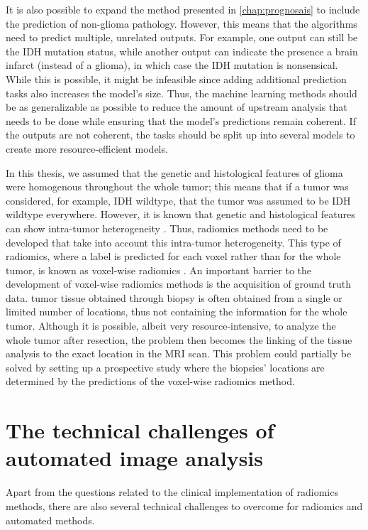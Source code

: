 It is also possible to expand the method presented in \cref{chap:prognosais} to include the prediction of non-glioma pathology.
However, this means that the algorithms need to predict multiple, unrelated outputs.
For example, one output can still be the \gls{IDH} mutation status, while another output can indicate the presence a brain infarct (instead of a glioma), in which case the \gls{IDH} mutation is nonsensical.
While this is possible, it might be infeasible since adding additional prediction tasks also increases the model's size.
Thus, the machine learning methods should be as generalizable as possible to reduce the amount of upstream analysis that needs to be done while ensuring that the model's predictions remain coherent.
If the outputs are not coherent, the tasks should be split up into several models to create more resource-efficient models.

In this thesis, we assumed that the genetic and histological features of glioma were homogenous throughout the whole \gls{tumor}; this means that if a \gls{tumor} was considered, for example, \gls{IDH} wildtype, that the \gls{tumor} was assumed to be \gls{IDH} wildtype everywhere.
However, it is known that genetic and histological features can show intra-\gls{tumor} heterogeneity \autocite{eder2014heterogeneity}.
Thus, radiomics methods need to be developed that take into account this intra-\gls{tumor} heterogeneity.
This type of radiomics, where a label is predicted for each voxel rather than for the whole \gls{tumor}, is known as voxel-wise radiomics \autocite{yogananda20201p19q}.
An important barrier to the development of voxel-wise radiomics methods is the acquisition of ground truth data.
\Gls{tumor} tissue obtained through biopsy is often obtained from a single or limited number of locations, thus not containing the information for the whole \gls{tumor}.
Although it is possible, albeit very resource-intensive, to analyze the whole \gls{tumor} after resection, the problem then becomes the linking of the tissue analysis to the exact location in the \gls{MRI} scan.
This problem could partially be solved by setting up a prospective study where the biopsies' locations are determined by the predictions of the voxel-wise radiomics method.


\section{The technical challenges of automated image analysis}\label{sec:discussion_technical}
Apart from the questions related to the clinical implementation of radiomics methods, there are also several technical challenges to overcome for radiomics and automated methods.

